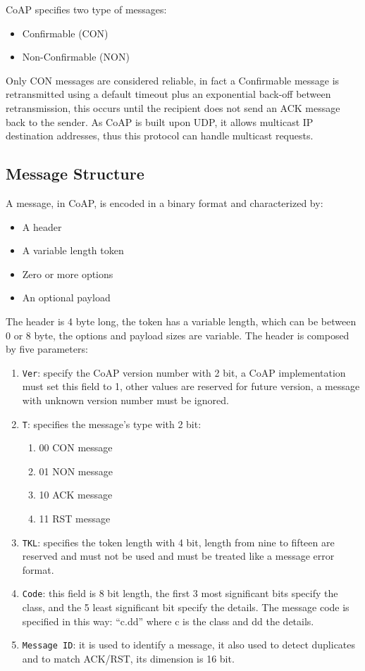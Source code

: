 	CoAP specifies two type of messages:
	\begin{itemize}
		\item Confirmable (CON)
		\item Non-Confirmable (NON)
	\end{itemize}
	Only CON messages are considered reliable, in fact a Confirmable message is retransmitted using a default timeout plus an exponential back-off between retransmission, this occurs until the recipient does not send an ACK message back to the sender.\newline
	As CoAP is built upon UDP, it allows multicast IP destination addresses, thus this protocol can handle multicast requests.\newline
	
	\subsection{Message Structure}
	A message, in CoAP, is encoded in a binary format and characterized by:\newline
	\begin{itemize}
		\item A header
		\item A variable length token
		\item Zero or more options
		\item An optional payload
	\end{itemize}
	The header is 4 byte long, the token has a variable length, which can be between 0 or 8 byte, the options and payload sizes are variable.\newline
	The header is composed by five parameters:\newline
	\begin{enumerate}
		\item \texttt{Ver}: specify the CoAP version number with 2 bit, a CoAP implementation must set this field to 1, other values are reserved for future version, a message with unknown version number must be ignored.
		\item \texttt{T}: specifies the message's type with 2 bit:
		\begin{enumerate}
			\item 00 CON message
			\item 01 NON message
			\item 10 ACK message
			\item 11 RST message
		\end{enumerate}
		\item \texttt{TKL}: specifies the token length with 4 bit, length from nine to fifteen are reserved and must not be used and must be treated like a message error format.
		\item \texttt{Code}: this field is 8 bit length, the first 3 most significant bits specify the class, and the 5 least significant bit specify the details.
		The message code is specified in this way: “c.dd” where c is the class and dd the details.
		\item \texttt{Message ID}: it is used to identify a message, it also used to detect duplicates and to match ACK/RST, its dimension is 16 bit.
	\end{enumerate}
	
